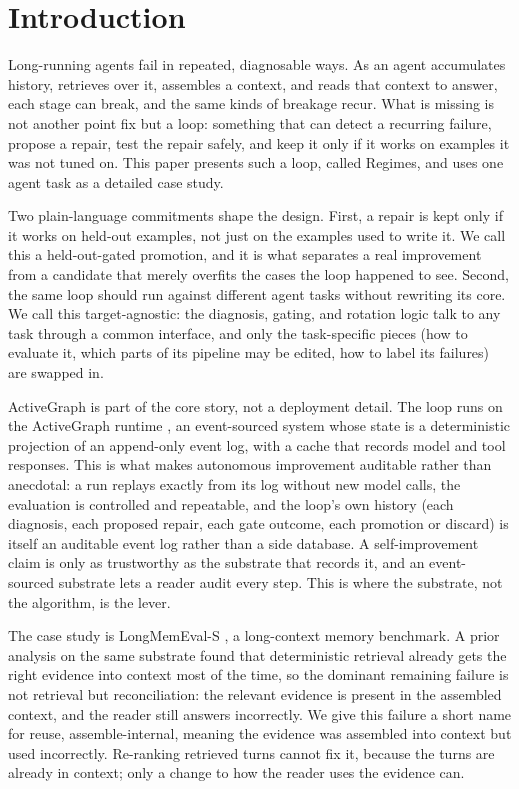 \section{Introduction}

Long-running agents fail in repeated, diagnosable ways. As an agent accumulates history, retrieves over it, assembles a context, and reads that context to answer, each stage can break, and the same kinds of breakage recur. What is missing is not another point fix but a loop: something that can detect a recurring failure, propose a repair, test the repair safely, and keep it only if it works on examples it was not tuned on. This paper presents such a loop, called Regimes, and uses one agent task as a detailed case study.

Two plain-language commitments shape the design. First, a repair is kept only if it works on held-out examples, not just on the examples used to write it. We call this a held-out-gated promotion, and it is what separates a real improvement from a candidate that merely overfits the cases the loop happened to see. Second, the same loop should run against different agent tasks without rewriting its core. We call this target-agnostic: the diagnosis, gating, and rotation logic talk to any task through a common interface, and only the task-specific pieces (how to evaluate it, which parts of its pipeline may be edited, how to label its failures) are swapped in.

ActiveGraph is part of the core story, not a deployment detail. The loop runs on the ActiveGraph runtime \citep{nakajima2026log}, an event-sourced system whose state is a deterministic projection of an append-only event log, with a cache that records model and tool responses. This is what makes autonomous improvement auditable rather than anecdotal: a run replays exactly from its log without new model calls, the evaluation is controlled and repeatable, and the loop's own history (each diagnosis, each proposed repair, each gate outcome, each promotion or discard) is itself an auditable event log rather than a side database. A self-improvement claim is only as trustworthy as the substrate that records it, and an event-sourced substrate lets a reader audit every step. This is where the substrate, not the algorithm, is the lever.

The case study is LongMemEval-S \citep{wu2024longmemeval}, a long-context memory benchmark. A prior analysis on the same substrate found that deterministic retrieval already gets the right evidence into context most of the time, so the dominant remaining failure is not retrieval but reconciliation: the relevant evidence is present in the assembled context, and the reader still answers incorrectly. We give this failure a short name for reuse, assemble-internal, meaning the evidence was assembled into context but used incorrectly. Re-ranking retrieved turns cannot fix it, because the turns are already in context; only a change to how the reader uses the evidence can.

